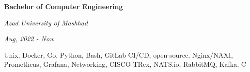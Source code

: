 \documentclass{engineercv}
\begin{document}
\begin{minipage}{\textwidth}
\begin{multicols}{2}
  \begin{minipage}{0.5\textwidth}
    \textbf{Bachelor of Computer Engineering}
    
    \textit{Azad University of Mashhad}
    
    \textit{Aug, 2022 - Now}
  \end{minipage}
  \columnbreak
  \begin{minipage}{0.5\textwidth}
      Unix, Docker, Go, Python, Bash, GitLab CI/CD, open-source,
      Nginx/NAXI, Prometheus, Grafana, Networking, CISCO TRex,
      NATS.io, RabbitMQ, Kafka, C
  \end{minipage}
\end{multicols}
\end{minipage}
\end{document}
